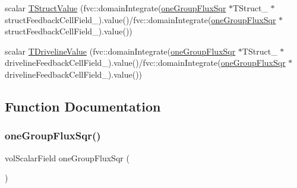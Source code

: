 \begin{DoxyCompactItemize}
\item 
scalar \hyperlink{computeFeedbackFieldValues_8H_a8baccdc34d49127c54a0a60ba9818c0c}{T\+Struct\+Value} (fvc\+::domain\+Integrate(\hyperlink{computeFeedbackFieldValues_8H_a965ade2a15637edaf7126bb8e4c39330}{one\+Group\+Flux\+Sqr} $\ast$T\+Struct\+\_\+ $\ast$struct\+Feedback\+Cell\+Field\+\_\+).value()/fvc\+::domain\+Integrate(\hyperlink{computeFeedbackFieldValues_8H_a965ade2a15637edaf7126bb8e4c39330}{one\+Group\+Flux\+Sqr} $\ast$struct\+Feedback\+Cell\+Field\+\_\+).value())
\item 
scalar \hyperlink{computeFeedbackFieldValues_8H_ae36e14f9b226d3a7c60b1a6245421b8e}{T\+Driveline\+Value} (fvc\+::domain\+Integrate(\hyperlink{computeFeedbackFieldValues_8H_a965ade2a15637edaf7126bb8e4c39330}{one\+Group\+Flux\+Sqr} $\ast$T\+Struct\+\_\+ $\ast$driveline\+Feedback\+Cell\+Field\+\_\+).value()/fvc\+::domain\+Integrate(\hyperlink{computeFeedbackFieldValues_8H_a965ade2a15637edaf7126bb8e4c39330}{one\+Group\+Flux\+Sqr} $\ast$driveline\+Feedback\+Cell\+Field\+\_\+).value())
\end{DoxyCompactItemize}


\subsection{Function Documentation}
\mbox{\label{computeFeedbackFieldValues_8H_a965ade2a15637edaf7126bb8e4c39330}} 
\subsubsection{\texorpdfstring{one\+Group\+Flux\+Sqr()}{oneGroupFluxSqr()}}
{\footnotesize\ttfamily vol\+Scalar\+Field one\+Group\+Flux\+Sqr (\begin{DoxyParamCaption}\item[{sqr(one\+Group\+Flux\+\_\+)}]{ }\end{DoxyParamCaption})}

\mbox{\label{computeFeedbackFieldValues_8H_a8b30ce5e08b618230e12e55e87d8afce}} 
